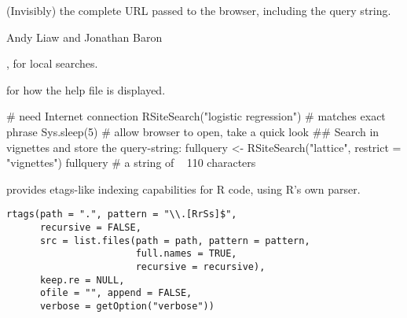 %
\begin{Value}
(Invisibly) the complete URL passed to the browser,
including the query string.
\end{Value}
%
\begin{Author}\relax
Andy Liaw and Jonathan Baron
\end{Author}
%
\begin{SeeAlso}\relax
{},  for local searches.

 for how the help file is displayed.
\end{SeeAlso}
%
\begin{Examples}
\begin{ExampleCode}
# need Internet connection
RSiteSearch("{logistic regression}") # matches exact phrase
Sys.sleep(5) # allow browser to open, take a quick look
## Search in vignettes and store the query-string:
fullquery <- RSiteSearch("lattice", restrict = "vignettes")
fullquery # a string of ~ 110 characters

\end{ExampleCode}
\end{Examples}
%
\begin{Description}\relax
{} provides etags-like indexing capabilities for R code,
using R's own parser.
\end{Description}
%
\begin{Usage}
\begin{verbatim}
rtags(path = ".", pattern = "\\.[RrSs]$",
      recursive = FALSE,
      src = list.files(path = path, pattern = pattern,
                       full.names = TRUE,
                       recursive = recursive),
      keep.re = NULL,
      ofile = "", append = FALSE,
      verbose = getOption("verbose"))
\end{verbatim}
\end{Usage}
%

